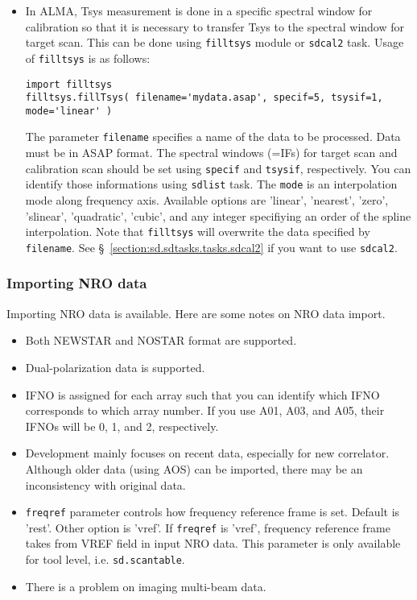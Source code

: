 \begin{itemize}
\item In ALMA, Tsys measurement is done in a specific spectral window
for calibration so that it is necessary to transfer Tsys to the
spectral window for target scan. This can be done using {\tt filltsys}
module or {\tt sdcal2} task. Usage of {\tt filltsys} is as follows:
\begin{verbatim}
import filltsys
filltsys.fillTsys( filename='mydata.asap', specif=5, tsysif=1, mode='linear' )
\end{verbatim}
The parameter {\tt filename} specifies a name of the data to be
processed. Data must be in ASAP format. The spectral windows (=IFs) for
target scan and calibration scan should be set using {\tt specif} and
{\tt tsysif}, respectively. You can identify those informations using
{\tt sdlist} task. The {\tt mode} is an interpolation mode along
frequency axis. Available options are 'linear', 'nearest', 'zero',
'slinear', 'quadratic', 'cubic', and any integer specifiying an order
of the spline interpolation.
Note that {\tt filltsys} will overwrite the data specified by
{\tt filename}. 
See \S~\ref{section:sd.sdtasks.tasks.sdcal2} if you want to use {\tt sdcal2}.
\end{itemize}

\subsubsection{Importing NRO data}

Importing NRO data is available. Here are some notes on NRO data import.

\begin{itemize}
\item Both NEWSTAR and NOSTAR format are supported.
\item Dual-polarization data is supported.
\item IFNO is assigned for each array such that you can identify which IFNO corresponds to which array number. If you use A01, A03, and A05, their IFNOs will be 0, 1, and 2, respectively.
\item Development mainly focuses on recent data, especially for new correlator.
Although older data (using AOS) can be imported, there may be an inconsistency with original data.
\item {\tt freqref} parameter controls how frequency reference frame is set. 
Default is 'rest'. Other option is 'vref'. If {\tt freqref} is 'vref', 
frequency reference frame takes from VREF field in input NRO data. This 
parameter is only available for tool level, i.e. {\tt sd.scantable}.
\item There is a problem on imaging multi-beam data. 
\end{itemize}


